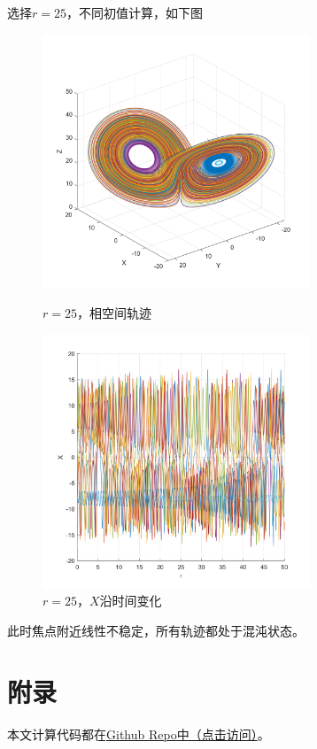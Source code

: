 \documentclass[UTF8,zihao=5]{ctexart} %
\begin{document}
选择$r=25$，不同初值计算，如下图
\begin{figure}[H]
    \begin{minipage}[c]{0.45\linewidth}  %
        \centering
        \includegraphics[width=8cm]{XYZ_r_25.png}  %
        \caption{$r=25$，相空间轨迹}
    \end{minipage}
    \hfill %
    \begin{minipage}[c]{0.45\linewidth}  %
        \centering
        \includegraphics[width=8cm]{XT_r_25.png}  %
        \caption{$r=25$，$X$沿时间变化}
    \end{minipage}
\end{figure}
此时焦点附近线性不稳定，所有轨迹都处于混沌状态。

\section{附录}
本文计算代码都在\href{https://github.com/harryzhou2000/HW_ACFD}{Github Repo中（点击访问）}。
\end{document}
